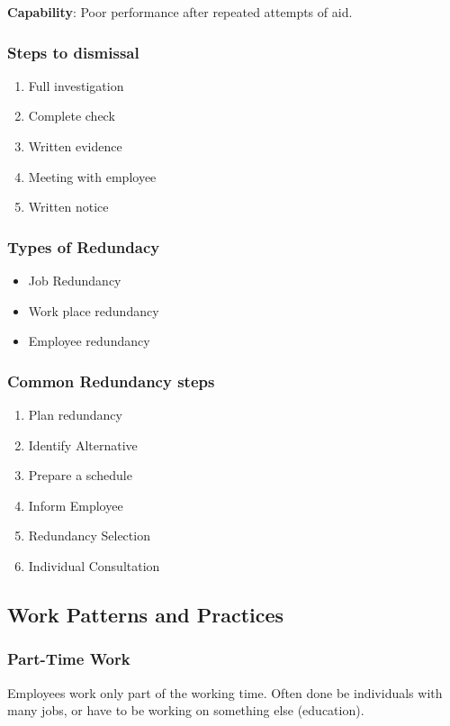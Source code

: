 \documentclass{standalone}
\begin{document}
\textbf{Capability}: Poor performance after repeated attempts of aid.

\subsubsection{Steps to dismissal}
\begin{enumerate}
	\item Full investigation
	\item Complete check
	\item Written evidence
	\item Meeting with employee
	\item Written notice
\end{enumerate}

\subsubsection{Types of Redundacy}
\begin{itemize}
	\item Job Redundancy
	\item Work place redundancy
	\item Employee redundancy
\end{itemize}

\subsubsection{Common Redundancy steps}
\begin{enumerate}
	\item Plan redundancy
	\item Identify Alternative
	\item Prepare a schedule
	\item Inform Employee
	\item Redundancy Selection
	\item Individual Consultation
\end{enumerate}

\subsection{Work Patterns and Practices}
\subsubsection{Part-Time Work}
Employees work only part of the working time.
Often done be individuals with many jobs, or have to be working on something else (education).
\end{document}
